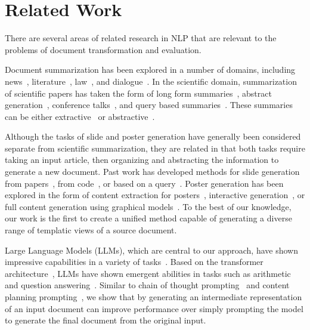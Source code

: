 \section{Related Work}

There are several areas of related research in NLP that are relevant to the problems of document transformation and evaluation.

Document summarization has been explored in a number of domains, including news~\cite{see-etal-2017-get}, literature~\cite{Scir2023EchoesFA}, law~\cite{Deroy2023HowRA}, and dialogue~\cite{Chen2021DialogSumAR}.
In the scientific domain, summarization of scientific papers has taken the form of long form summaries~\cite{chandrasekaran2020overview}, abstract generation~\cite{Cohan2015ScientificAS}, conference talks~\cite{Lev2019TalkSummAD}, and query based summaries~\cite{Fok2023QlarifyBS}. These summaries can be either extractive~\cite{Sefid2022SciBERTSUMES} or abstractive~\cite{chandrasekaran2020overview}. 

Although the tasks of slide and poster generation have generally been considered separate from scientific summarization, they are related in that both tasks require taking an input article, then organizing and abstracting the information to generate a new document. Past work has developed methods for slide generation from papers~\cite{Hu2015PPSGenLP, Li2021TowardsTS, Hu2015PPSGenLP,Fu2021DOC2PPTAP}, from code~\cite{Wang2023Slide4NCP}, or based on a query~\cite{Sun2021D2SDG}. Poster generation has been explored in the form of content extraction for posters~\cite{Xu2021NeuralCE}, interactive generation~\cite{Wang2015iPosterIP}, or full content generation using graphical models~\cite{Qiang2016LearningTG}. To the best of our knowledge, our work is the first to create a unified method capable of generating a diverse range of templatic views of a source document. %

Large Language Models (LLMs), which are central to our approach, have shown impressive capabilities in a variety of tasks~\cite{radford2019language,Brown2020LanguageMA}. Based on the transformer architecture~\cite{Vaswani2017AttentionIA}, LLMs have shown emergent abilities in tasks such as arithmetic and question answering~\cite{Wei2022EmergentAO}. %
Similar to chain of thought prompting~\cite{Wei2022ChainOT} and content planning prompting~\cite{Wang2022SelfConsistencyIC}, we show that by generating an intermediate representation of an input document can improve performance over simply prompting the model to generate the final document from the original input. 

